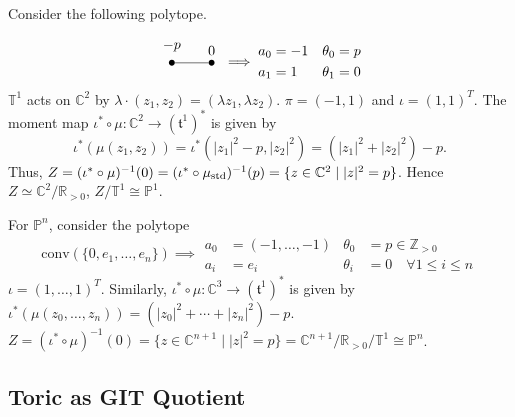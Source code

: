 \documentclass[b5paper]{article}
\begin{document}
\begin{example}{}
    Consider the following polytope.
    \begin{equation*}
        \begin{tikzpicture}[every node/.style={circle,fill=black,minimum width=1.5pt,inner sep=1.5pt}]
            \node[label={$-p$}] (A) at (0,0) {};
            \node[label={$0$}] (B) at (1,0) {};
            \draw (A) -- (B);
        \end{tikzpicture}
        \implies
        \begin{aligned}
            a_0 &= -1 & \theta_0 &= p \\
            a_1 &= 1 & \theta_1 &= 0
        \end{aligned}
    \end{equation*}
    $\mathbb{T}^1$ acts on $\mathbb{C}^2$ by $\lambda \cdot (z_1, z_2) = (\lambda z_1, \lambda z_2)$. $\pi=(-1,1)$ and $\iota=(1,1)^T$.
    The moment map $\iota^* \circ \mu : \mathbb{C}^2 \to (\mathfrak{t}^1)^*$ is given by
    \begin{equation*}
        \iota^*(\mu(z_1, z_2)) = \iota^*(|z_1|^2-p, |z_2|^2) = (|z_1|^2+|z_2|^2) - p.
    \end{equation*}
    Thus, $Z = (\iota^* \circ \mu)^{-1}(0) = (\iota^* \circ \mu_\textnormal{std})^{-1}(p) = \{ z \in \mathbb{C}^2 \mid |z|^2 = p\}$. Hence $Z\simeq \mathbb{C}^2 / \mathbb{R}_{>0}$, $Z/\mathbb{T}^1 \cong \mathbb{P}^1$.

    For $\mathbb{P}^n$, consider the polytope
    \begin{equation*}
        \mathrm{conv}(\{ 0, e_1, \dots, e_n \})
        \implies
        \begin{aligned}
            a_0 &= (-1, \dots, -1) & \theta_0 &= p \in \mathbb{Z}_{>0} \\
            a_i &= e_i & \theta_i &= 0 \quad \forall 1 \leq i \leq n
        \end{aligned}
    \end{equation*}
    $\iota=(1,\dots ,1)^T$.
    Similarly, $\iota^* \circ \mu : \mathbb{C}^3 \to (\mathfrak{t}^1)^*$ is given by
    $\iota^*(\mu(z_0, \dots, z_n)) = (|z_0|^2+\cdots+|z_n|^2) - p$.
    $Z = (\iota^* \circ \mu)^{-1}(0) = \{ z \in \mathbb{C}^{n+1} \mid |z|^2 = p\}=\mathbb{C}^{n+1} / \mathbb{R}_{>0}/\mathbb{T}^1 \cong \mathbb{P}^n$.
\end{example}

\subsection{Toric as GIT Quotient}
\end{document}
